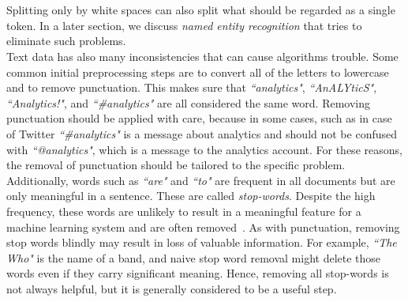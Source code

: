      \\
\\
Splitting only by white spaces can also split what should be regarded as a single token. In a later section, we discuss \emph{named entity recognition} that tries to eliminate such problems.  \\
\noindent
Text data has also many inconsistencies that can cause algorithms trouble. Some common initial preprocessing steps are to convert all of the letters to lowercase and to remove punctuation. 
This makes sure that \emph{``analytics"}, \emph{``AnALYticS"}, \emph{``Analytics!"}, and \emph{``\#analytics"} are all considered the same word. Removing punctuation should be applied with care, because in some cases, such as in case of Twitter \emph{``\#analytics"} is a message about analytics and should not be confused with \emph{``@analytics"}, which is a message to the analytics account. For these reasons, the removal of punctuation should be tailored to the specific problem.\\
Additionally, words such as \emph{``are"} and \emph{``to"} are frequent in all documents but are only meaningful in a sentence. These are called \emph{stop-words}. Despite the high frequency, these words are unlikely to result in a meaningful feature for a machine learning system and are often removed~. As with punctuation, removing stop words blindly may result in loss of valuable information. For example, \emph{``The Who"} is the name of a band, and naive stop word removal might delete those words even if they carry significant meaning. Hence, removing all stop-words is not always helpful, but it is generally considered to be a useful step. 

